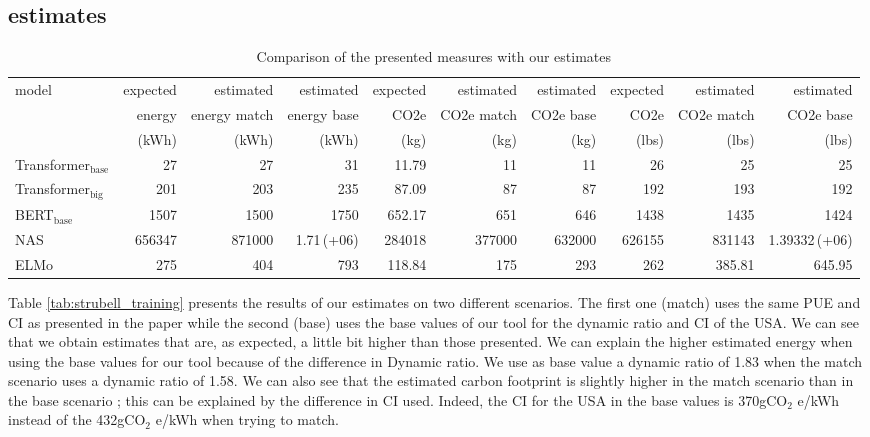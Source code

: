 \documentclass[11pt]{article}
\begin{document}
\subsection{estimates}
\label{sec:org723ca1e}

\begin{table}[htbp]
\caption{Comparison of the presented measures with our estimates}
\centering
\begin{tabular}{lrrrrrrrrr}
model & expected & estimated & estimated & expected & estimated & estimated & expected & estimated & estimated\\
 & energy & energy match & energy base & CO2e & CO2e match & CO2e base & CO2e & CO2e match & CO2e base\\
 & (kWh) & (kWh) & (kWh) & (kg) & (kg) & (kg) & (lbs) & (lbs) & (lbs)\\
\hline
Transformer\(_{\text{base}}\) & 27 & 27 & 31 & 11.79 & 11 & 11 & 26 & 25 & 25\\
Transformer\(_{\text{big}}\) & 201 & 203 & 235 & 87.09 & 87 & 87 & 192 & 193 & 192\\
BERT\(_{\text{base}}\) & 1507 & 1500 & 1750 & 652.17 & 651 & 646 & 1438 & 1435 & 1424\\
NAS & 656347 & 871000 & 1.71\,(+06) & 284018 & 377000 & 632000 & 626155 & 831143 & 1.39332\,(+06)\\
ELMo & 275 & 404 & 793 & 118.84 & 175 & 293 & 262 & 385.81 & 645.95\\
\end{tabular}
\end{table}

Table \ref{tab:strubell_training} presents the results of our
estimates on two different scenarios. The first one (match) uses the
same \gls{PUE} and \gls{CI} as presented in the paper while the second
(base) uses the base values of our tool for the dynamic ratio and \gls{CI} of the USA. We can see that we obtain estimates that are, as expected, a little
bit higher than those presented.
We can explain the higher estimated energy when using the base values
for our tool because of the difference in Dynamic ratio. We use as
base value a dynamic ratio of 1.83 when the match scenario uses a
dynamic ratio of 1.58. We can also see that the estimated carbon
footprint is slightly higher in the match scenario than in the base
scenario ; this can be explained by the difference in \gls{CI}
used. Indeed, the \gls{CI} for the USA in the base values
is 370gCO\(_{\text{2}}\) e/kWh instead of the 432gCO\(_{\text{2}}\) e/kWh when trying to match.
\end{document}
